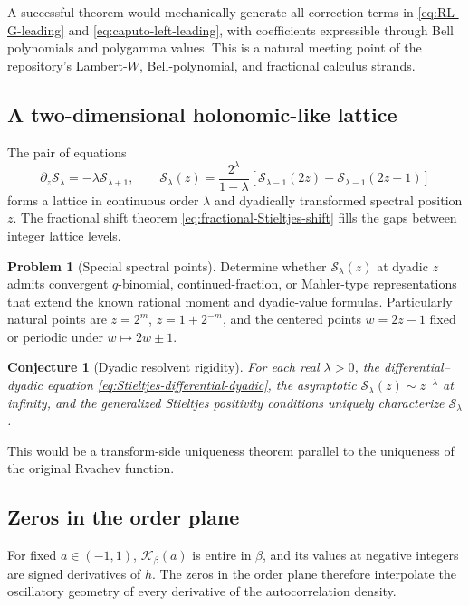 \documentclass[11pt,oneside]{article}
\newtheorem{conjecture}[theorem]{Conjecture}
\theoremstyle{definition}
\newtheorem{problem}[theorem]{Problem}
\theoremstyle{remark}
\newcommand{\Kord}{\mathcal K}
\newcommand{\Sord}{\mathcal S}
\begin{document}
A successful theorem would mechanically generate all correction terms in
\eqref{eq:RL-G-leading} and \eqref{eq:caputo-left-leading}, with coefficients
expressible through Bell polynomials and polygamma values.  This is a natural
meeting point of the repository's Lambert-$W$, Bell-polynomial, and fractional
calculus strands.

\subsection{A two-dimensional holonomic-like lattice}

The pair of equations
\begin{equation}
 \partial_z\Sord_\lambda=-\lambda\Sord_{\lambda+1},
 \qquad
 \Sord_\lambda(z)=\frac{2^\lambda}{1-\lambda}
 [\Sord_{\lambda-1}(2z)-\Sord_{\lambda-1}(2z-1)]
\end{equation}
forms a lattice in continuous order $\lambda$ and dyadically transformed
spectral position $z$.  The fractional shift theorem
\eqref{eq:fractional-Stieltjes-shift} fills the gaps between integer lattice
levels.

\begin{problem}[Special spectral points]
Determine whether $\Sord_\lambda(z)$ at dyadic $z$ admits convergent
$q$-binomial, continued-fraction, or Mahler-type representations that extend
the known rational moment and dyadic-value formulas.  Particularly natural
points are $z=2^m$, $z=1+2^{-m}$, and the centered points $w=2z-1$ fixed or
periodic under $w\mapsto2w\pm1$.
\end{problem}

\begin{conjecture}[Dyadic resolvent rigidity]
For each real $\lambda>0$, the differential--dyadic equation
\eqref{eq:Stieltjes-differential-dyadic}, the asymptotic
$\Sord_\lambda(z)\sim z^{-\lambda}$ at infinity, and the generalized
Stieltjes positivity conditions uniquely characterize $\Sord_\lambda$.
\end{conjecture}

This would be a transform-side uniqueness theorem parallel to the uniqueness
of the original Rvachev function.

\subsection{Zeros in the order plane}

For fixed $a\in(-1,1)$, $\Kord_\beta(a)$ is entire in $\beta$, and its values
at negative integers are signed derivatives of $h$.  The zeros in the order
plane therefore interpolate the oscillatory geometry of every derivative of
the autocorrelation density.
\end{document}
